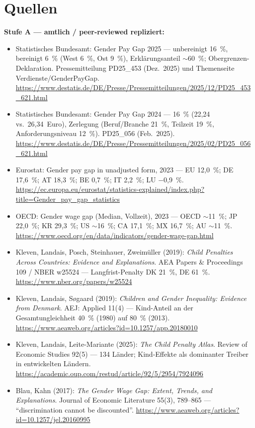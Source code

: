 \section{Quellen}

\textbf{Stufe A --- amtlich / peer-reviewed repliziert:}
\begin{itemize}
\item Statistisches Bundesamt: Gender Pay Gap 2025 --- unbereinigt 16~\%, bereinigt 6~\% (West 6~\%, Ost 9~\%), Erkl\"arungsanteil \(\sim\)60~\%; Obergrenzen-Deklaration. Pressemitteilung PD25\_453 (Dez.\ 2025) und Themenseite Verdienste/GenderPayGap. \url{https://www.destatis.de/DE/Presse/Pressemitteilungen/2025/12/PD25_453_621.html}
\item Statistisches Bundesamt: Gender Pay Gap 2024 --- 16~\% (22,24 vs.\ 26,34~Euro), Zerlegung (Beruf/Branche 21~\%, Teilzeit 19~\%, Anforderungsniveau 12~\%). PD25\_056 (Feb.\ 2025). \url{https://www.destatis.de/DE/Presse/Pressemitteilungen/2025/02/PD25_056_621.html}
\item Eurostat: Gender pay gap in unadjusted form, 2023 --- EU 12,0~\%; DE 17,6~\%; AT 18,3~\%; BE 0,7~\%; IT 2,2~\%; LU $-$0,9~\%. \url{https://ec.europa.eu/eurostat/statistics-explained/index.php?title=Gender_pay_gap_statistics}
\item OECD: Gender wage gap (Median, Vollzeit), 2023 --- OECD \(\sim\)11~\%; JP 22,0~\%; KR 29,3~\%; US \(\sim\)16~\%; CA 17,1~\%; MX 16,7~\%; AU \(\sim\)11~\%. \url{https://www.oecd.org/en/data/indicators/gender-wage-gap.html}
\item Kleven, Landais, Posch, Steinhauer, Zweim\"uller (2019): \emph{Child Penalties Across Countries: Evidence and Explanations}. AEA Papers \& Proceedings 109 / NBER w25524 --- Langfrist-Penalty DK 21~\%, DE 61~\%. \url{https://www.nber.org/papers/w25524}
\item Kleven, Landais, S{\o}gaard (2019): \emph{Children and Gender Inequality: Evidence from Denmark}. AEJ: Applied 11(4) --- Kind-Anteil an der Gesamtungleichheit 40~\% (1980) auf 80~\% (2013). \url{https://www.aeaweb.org/articles?id=10.1257/app.20180010}
\item Kleven, Landais, Leite-Mariante (2025): \emph{The Child Penalty Atlas}. Review of Economic Studies 92(5) --- 134 L\"ander; Kind-Effekte als dominanter Treiber in entwickelten L\"andern. \url{https://academic.oup.com/restud/article/92/5/2954/7924096}
\item Blau, Kahn (2017): \emph{The Gender Wage Gap: Extent, Trends, and Explanations}. Journal of Economic Literature 55(3), 789--865 --- \enquote{discrimination cannot be discounted}. \url{https://www.aeaweb.org/articles?id=10.1257/jel.20160995}

\end{itemize}
